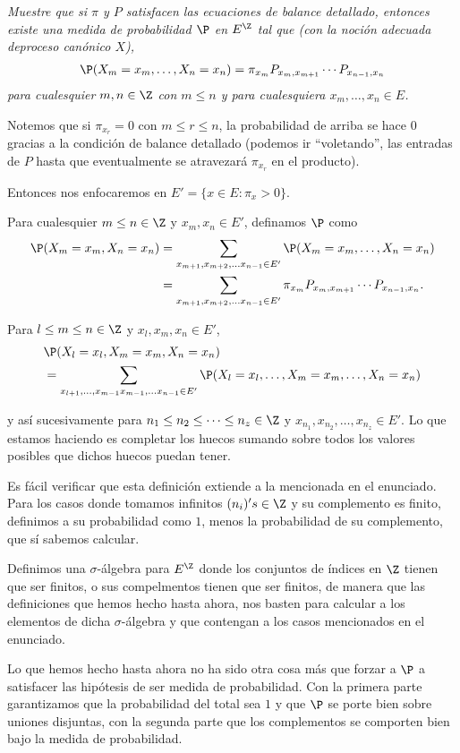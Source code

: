 \emph{
    Muestre que si $\pi$ y $P$ satisfacen las ecuaciones de balance detallado, entonces existe una medida de probabilidad
    $\P$ en $E^{\Z}$ tal que (con la noción adecuada deproceso canónico $X$),
    \begin{align}
            \P(X_m = x_m, \dots, X_n = x_n) = \pi_{x_m} P_{x_m, x_{m+1}} \cdots P_{x_{n-1}, x_{n}}
    \end{align}
    para cualesquier $m,n \in \Z$ con $m \leq n$ y para cualesquiera $x_m, \dots, x_n \in E$.
}

\afterstatement\pn


Notemos que si $\pi_{x_r} = 0$ con $m \leq r \leq n$, la probabilidad de arriba se hace $0$ gracias a la condición de
balance detallado (podemos ir ``voletando'', las entradas de $P$ hasta que eventualmente se atravezará $\pi_{x_r}$ en el producto).\pn

Entonces nos enfocaremos en $E' = \{x \in E : \pi_x > 0 \}$.\pn

Para cualesquier $m \leq n \in \Z$ y $x_m, x_n \in E'$, definamos $\P$ como
\begin{align}
    \P(X_m = x_m, X_n = x_n)    &= \sum_{x_{m+1}, x_{m+2},\dots x_{n-1} \in E'}   \P(X_m = x_m, \dots, X_n = x_n)                        \\
                                &= \sum_{x_{m+1}, x_{m+2},\dots x_{n-1} \in E'}   \pi_{x_m} P_{x_m, x_{m+1}} \cdots P_{x_{n-1}, x_{n}}.   \\
\end{align}\pn

Para $l \leq m \leq n \in \Z$ y $x_l, x_m, x_n \in E'$,
\begin{align}
    &\P(X_l = x_l, X_m = x_m, X_n = x_n) \\
    &=  \sum_{x_{l+1}, \dots, x_{m-1} x_{m-1},\dots x_{n-1} \in E'}   \P(X_l = x_l, \dots, X_m = x_m, \dots, X_n = x_n)
\end{align}\pn

 y así sucesivamente para ${n_1} \leq {n_2} \leq \dots \leq {n_z} \in \Z$ y $x_{n_1}, x_{n_2}, \dots, x_{n_z} \in E'$. Lo que estamos haciendo
es completar los huecos sumando sobre todos los valores posibles que dichos huecos puedan tener.\pn

Es fácil verificar que esta definición extiende a la mencionada en el enunciado. Para los casos donde tomamos infinitos $(n_i)'s \in \Z$ y su complemento
es finito, definimos a su probabilidad como $1$, menos la probabilidad de su complemento, que sí sabemos calcular.\pn

Definimos una $\sigma$-álgebra para $E^\Z$ donde los conjuntos de índices en $\Z$ tienen que ser finitos, o sus 
compelmentos tienen que ser finitos, de manera que las definiciones que hemos hecho hasta ahora, nos basten para 
calcular a los elementos de dicha $\sigma$-álgebra y que contengan a los casos mencionados en el enunciado.

Lo que hemos hecho hasta ahora no ha sido otra cosa más que forzar a $\P$ a satisfacer las hipótesis de ser medida de probabilidad.\pn
Con la primera parte garantizamos que la probabilidad del total sea $1$ y que $\P$ se porte bien sobre uniones disjuntas, con la segunda parte que 
los complementos se comporten bien bajo la medida de probabilidad.

